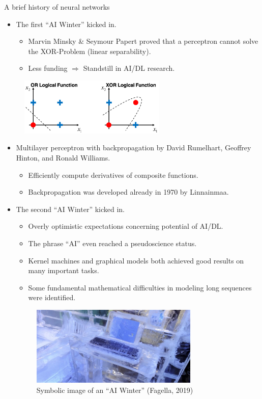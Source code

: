 \begin{vbframe}{A brief history of neural networks}
\begin{itemize}
\item {} The first \enquote{AI Winter} kicked in.
\begin{itemize}
\item Marvin Minsky \& Seymour Papert proved that a perceptron cannot solve the XOR-Problem (linear separability).
\item Less funding $\Rightarrow$ Standstill in AI/DL research.
\end{itemize}
\end{itemize}
\begin{figure}
\includegraphics[width=7cm]{figure/orvsxor.png}
\end{figure}
\begin{itemize}
\item {} Multilayer perceptron with backpropagation by David Rumelhart, Geoffrey Hinton, and Ronald Williams.
\begin{itemize}
\item Efficiently compute derivatives of composite functions.
\item Backpropagation was developed already in 1970 by Linnainmaa.
\end{itemize}
\framebreak

\item {} The second \enquote{AI Winter} kicked in.

\begin{itemize}
\footnotesize\item Overly optimistic expectations concerning potential of AI/DL.
\footnotesize\item The phrase \enquote{AI} even reached a pseudoscience status.
\footnotesize\item Kernel machines and graphical models both achieved good results on many important tasks.
\footnotesize\item Some fundamental mathematical difficulties in modeling long sequences were identified.
\end{itemize}
\begin{figure}
\includegraphics[width=8cm]{figure/ai_winter.jpg}
\caption{Symbolic image of an \enquote{AI Winter} (Fagella, 2019)}
\end{figure}
\framebreak


\end{itemize}
\end{vbframe}
